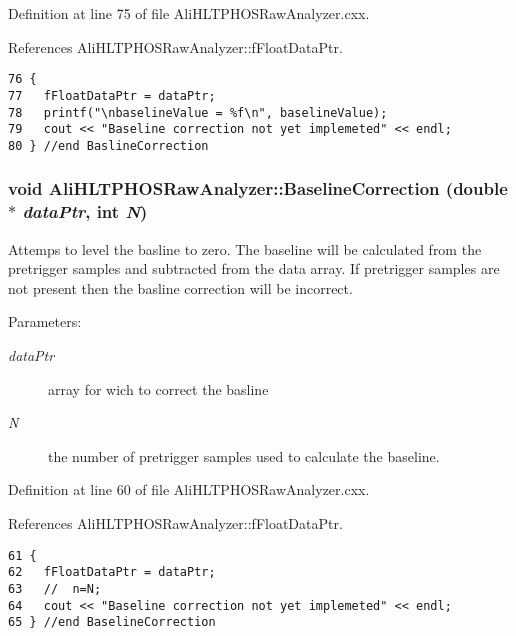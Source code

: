 Definition at line 75 of file Ali\-HLTPHOSRaw\-Analyzer.cxx.

References Ali\-HLTPHOSRaw\-Analyzer::f\-Float\-Data\-Ptr.

\footnotesize\begin{verbatim}76 {
77   fFloatDataPtr = dataPtr;   
78   printf("\nbaselineValue = %f\n", baselineValue);
79   cout << "Baseline correction not yet implemeted" << endl;
80 } //end BaslineCorrection
\end{verbatim}\normalsize 


\subsubsection{\setlength{\rightskip}{0pt plus 5cm}void Ali\-HLTPHOSRaw\-Analyzer::Baseline\-Correction (double $\ast$ {\em data\-Ptr}, int {\em N})\hspace{0.3cm}{\tt  [inherited]}}\label{classAliHLTPHOSRawAnalyzer_AliHLTPHOSRawAnalyzerPeakFindera7}


Attemps to level the basline to zero. The baseline will be calculated from the pretrigger samples and subtracted from the data array. If pretrigger samples are not present then the basline correction will be incorrect. \begin{Desc}
\item[Parameters:]
\begin{description}
\item[{\em data\-Ptr}]array for wich to correct the basline \item[{\em N}]the number of pretrigger samples used to calculate the baseline. \end{description}
\end{Desc}


Definition at line 60 of file Ali\-HLTPHOSRaw\-Analyzer.cxx.

References Ali\-HLTPHOSRaw\-Analyzer::f\-Float\-Data\-Ptr.

\footnotesize\begin{verbatim}61 {
62   fFloatDataPtr = dataPtr;  
63   //  n=N;
64   cout << "Baseline correction not yet implemeted" << endl;
65 } //end BaselineCorrection
\end{verbatim}\normalsize 


